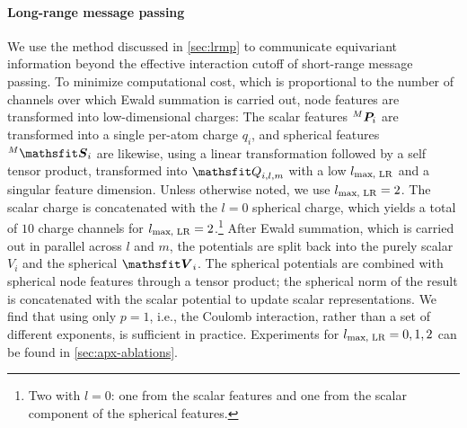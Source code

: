 \documentclass[10pt]{article} %
\begin{document}
\paragraph{Long-range message passing} We use the method discussed in \cref{sec:lrmp} to communicate equivariant information beyond the effective interaction cutoff of short-range message passing. To minimize computational cost, which is proportional to the number of channels over which Ewald summation is carried out, node features are transformed into low-dimensional charges: The scalar features ${}^M{\bm{P}}_i$ are transformed into a single per-atom charge $q_i$, and spherical features ${}^M\sphf_i$ are likewise, using a linear transformation followed by a self tensor product, transformed into $\etQ_{i,l,m}$ with a low $l_{\text{max, LR}}$ and a singular feature dimension. Unless otherwise noted, we use $l_{\text{max, LR}}=2$. The scalar charge is concatenated with the $l=0$ spherical charge, which yields a total of $10$ charge channels for $l_{\text{max, LR}}=2$.\footnote{Two with $l{=}0$: one from the scalar features and one from the scalar component of the spherical features.}
After Ewald summation, which is carried out in parallel across $l$ and $m$, the potentials are split back into the purely scalar $V_i$ and the spherical $\tV_i$. The spherical potentials are combined with spherical node features through a tensor product; the spherical norm of the result is concatenated with the scalar potential to update scalar representations.
We find that using only $p{=}1$, i.e., the Coulomb interaction, rather than a set of different exponents, is sufficient in practice. Experiments for $l_{\text{max, LR}}=0,1,2$ can be found in \cref{sec:apx-ablations}.

\end{document}

